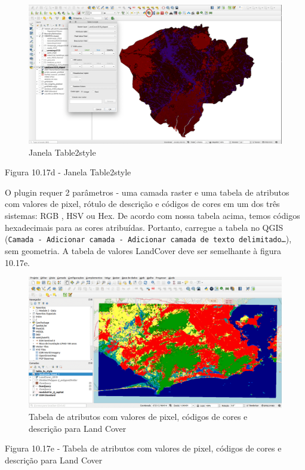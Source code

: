 \documentclass[
]{krantz}
\begin{document}
\begin{figure}
\centering
\includegraphics{media/modulo10/fig1017_d.png}
\caption{Janela Table2style}
\end{figure}

Figura 10.17d - Janela Table2style

O plugin requer 2 parâmetros - uma camada raster e uma tabela de atributos com valores de pixel, rótulo de descrição e códigos de cores em um dos três sistemas: RGB , HSV ou Hex. De acordo com nossa tabela acima, temos códigos hexadecimais para as cores atribuídas. Portanto, carregue a tabela no QGIS (\texttt{Camada\ -\ Adicionar\ camada\ -\ Adicionar\ camada\ de\ texto\ delimitado…}), sem geometria. A tabela de valores LandCover deve ser semelhante à figura 10.17e.

\begin{figure}
\centering
\includegraphics{media/modulo10/fig1017_e.png}
\caption{Tabela de atributos com valores de pixel, códigos de cores e descrição para Land Cover}
\end{figure}

Figura 10.17e - Tabela de atributos com valores de pixel, códigos de cores e descrição para Land Cover
\end{document}
